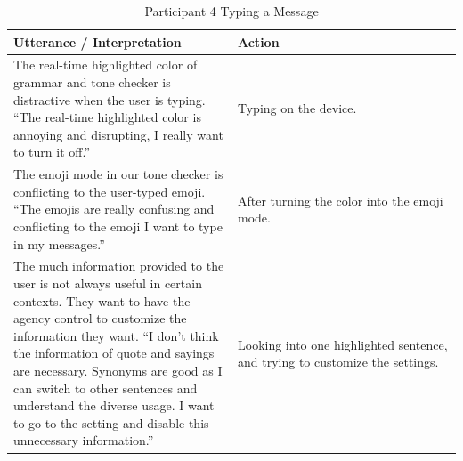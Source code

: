\documentclass[acmsmall,screen,authorversion,nonacm]{acmart}
\begin{document}
\begin{table}[H]
\begin{tabular}{|p{0.5 \linewidth}|p{0.5 \linewidth}|}
\hline
Utterance / Interpretation & Action                                               \\ \hline
The real-time highlighted color of grammar and tone checker is distractive when the user is typing. ``The real-time highlighted color is annoying and disrupting, I really want to turn it off.'' & Typing on the device.                                  
\\ \hline
The emoji mode in our tone checker is conflicting to the user-typed emoji. ``The emojis are really confusing and conflicting to the emoji I want to type in my messages.'' & After turning the color into the emoji mode.
\\ \hline
The much information provided to the user is not always useful in certain contexts. They want to have the agency control to customize the information they want. ``I don’t think the information of quote and sayings are necessary. Synonyms are good as I can switch to other sentences and understand the diverse usage. I want to go to the setting and disable this unnecessary information.'' & Looking into one highlighted sentence, and trying to customize the settings.
\\ \hline
\end{tabular}
\caption{Participant 4 Typing a Message}
\label{tab:SimpUser4Task2}
\end{table}
\end{document}
